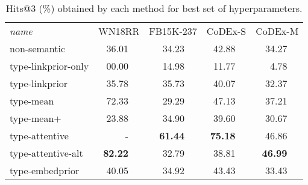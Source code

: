 \begin{table}
    \def\fn{\hspace{2pt}} %
    \setlength{\tabcolsep}{5pt}
    \centering
    \begin{tabular}{lr@{\fn}lr@{\fn}lr@{\fn}lr@{\fn}l}
        \toprule
        \textit{name}
                &\multicolumn{2}{c}{WN18RR}
                            &\multicolumn{2}{c}{FB15K-237}   
                                           & \multicolumn{2}{c}{CoDEx-S}   
                                                                & \multicolumn{2}{c}{CoDEx-M} \\
        \cmidrule{1-9}
        non-semantic         & 36.01    && 34.23
                                                    && 42.88    && 34.27  \\
        \cmidrule{1-9}
        type-linkprior-only  & 00.00    && 14.98	&& 11.77    &&  4.78  \\
        type-linkprior       & 35.78	&& 35.73    && 40.07    && 32.37  \\
        \cmidrule{1-9}
        type-mean            & 72.33    && 29.29    && 47.13    && 37.21  \\
        type-mean+           & 23.88    && 34.90    && 39.60    && 30.67  \\
        type-attentive       & -        && \textbf{61.44}    
                                                    && \textbf{75.18}     
                                                                && 46.86  \\
        type-attentive-alt   & \textbf{82.22} 
                                        && 32.79    && 38.81    && \textbf{46.99}  \\
        \cmidrule{1-9}
        type-embedprior      & 40.05    && 34.92    && 43.43    && 33.43  \\
        \bottomrule
    \end{tabular} \vspace{1em}
    \caption[Hits@3 obtained by each method for best set of hyperparameters.]{Hits@3 (\%) obtained by each method for best set of hyperparameters. }\label{tab:hyperparam-search-results3b}
\end{table}

